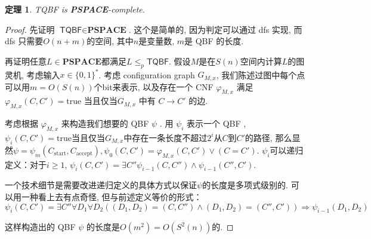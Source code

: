 \documentclass[8pt]{article}
\theoremstyle{compact}
\newtheorem{theorem}{定理}
\def\le{\leqslant}
\def\ge{\geqslant}
\def\PSPACE{\textbf{PSPACE}}
\begin{document}
\begin{theorem}
	\textsf{TQBF} is \PSPACE-complete.
\end{theorem}
\begin{proof}
	先证明 $\textsf{TQBF} \in \PSPACE$. 这个是简单的, 因为判定可以通过 dfs 实现, 而 dfs 只需要$O(n + m)$的空间, 其中$n$是变量数, $m$是 QBF 的长度. 

	再证明任意$L \in \PSPACE$都满足$L \le_p \textsf{TQBF}$. 假设$M$是在$S(n)$空间内计算$L$的图灵机, 考虑输入$x \in \{0, 1\}^*$. 考虑 configuration graph $G_{M, x}$, 我们陈述过图中每个点可以用$m = O(S(n))$个bit来表示, 以及存在一个 CNF $\varphi_{M, x}$ 满足$\varphi_{M, x}(C, C') = \textrm{true}$ 当且仅当$G_{M, x}$ 中有 $C \to C'$ 的边. 

	考虑根据 $\varphi_{M, x}$ 来构造我们想要的 QBF $\psi$ . 用 $\psi_i$ 表示一个 QBF , $\psi_i(C, C') = \textrm{true}$当且仅当$G_{M, x}$中存在一条长度不超过$2^i$从$C$到$C'$的路径, 那么显然$\psi = \psi_m(C_{\text{start}}, C_{\text{accept}}), \psi_0(C, C') = \varphi_{M, x}(C, C') \vee (C = C')$. $\psi_i$可以递归定义：对于$i \ge 1$, $\psi_i(C, C') = \exists C'' \psi_{i-1}(C, C'') \wedge \psi_{i-1}(C'', C')$. 

	一个技术细节是需要改进递归定义的具体方式以保证$\psi$的长度是多项式级别的. 可以用一种看上去有点奇怪, 但与前述定义等价的形式：
	$$\psi_i(C, C') = \exists C''\forall D_1 \forall D_2 ((D_1, D_2) = (C, C'') \wedge (D_1, D_2) = (C'', C')) \Rightarrow \psi_{i-1}(D_1, D_2)$$

	这样构造出的 QBF $\psi$ 的长度是$O(m^2) = O(S^2(n))$的. 
\end{proof}
\end{document}
